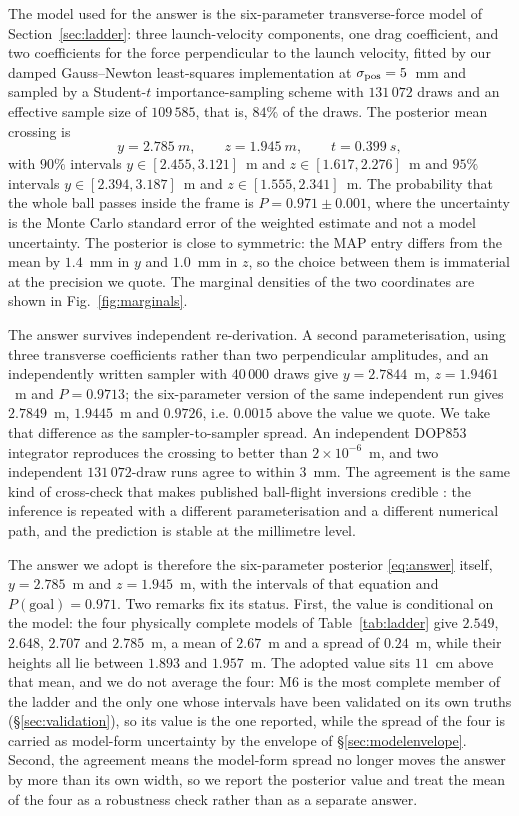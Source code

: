 The model used for the answer is the six-parameter transverse-force model of
Section~\ref{sec:ladder}: three launch-velocity components, one drag coefficient,
and two coefficients for the force perpendicular to the launch velocity, fitted by
our damped Gauss--Newton least-squares implementation at
$\sigma_{\rm pos}=5$~mm and sampled by a Student-$t$ importance-sampling scheme
with $131\,072$ draws and an effective sample size of $109\,585$, that is, $84\%$
of the draws. The posterior mean crossing is
\begin{equation}
  y = 2.785~\si{m}, \qquad z = 1.945~\si{m}, \qquad t = 0.399~\si{s},
  \label{eq:answer}
\end{equation}
with $90\%$ intervals $y\in[2.455,3.121]$~m and $z\in[1.617,2.276]$~m and
$95\%$ intervals $y\in[2.394,3.187]$~m and $z\in[1.555,2.341]$~m. The
probability that the whole ball passes inside the frame is $P=0.971\pm0.001$,
where the uncertainty is the Monte Carlo standard error of the weighted estimate
and not a model uncertainty. The posterior is
close to symmetric: the MAP entry differs from the mean by $1.4$~mm in $y$ and
$1.0$~mm in $z$, so the choice between them is immaterial at the precision we
quote. The marginal densities of the two coordinates are shown in
Fig.~\ref{fig:marginals}.

The answer survives independent re-derivation. A second parameterisation, using
three transverse coefficients rather than two perpendicular amplitudes, and an
independently written sampler with $40\,000$ draws give $y=2.7844$~m,
$z=1.9461$~m and $P=0.9713$; the six-parameter version of the same independent
run gives $2.7849$~m, $1.9445$~m and $0.9726$, i.e. $0.0015$ above the value we
quote. We take that difference as the sampler-to-sampler spread. An independent DOP853 integrator
reproduces the crossing to better than $2\times10^{-6}$~m, and two independent
$131\,072$-draw runs agree to within $3$~mm. The agreement is the same kind of
cross-check that makes published ball-flight inversions credible
\citep{nathan2008pitchfx,florio2019}: the inference is repeated with a different
parameterisation and a different numerical path, and the prediction is stable at
the millimetre level.

The answer we adopt is therefore the six-parameter posterior
\eqref{eq:answer} itself, $y=2.785$~m and $z=1.945$~m, with the intervals of
that equation and $P(\text{goal})=0.971$. Two remarks fix its status. First,
the value is conditional on the model: the four physically complete models of
Table~\ref{tab:ladder} give $2.549$, $2.648$, $2.707$ and $2.785$~m, a mean of
$2.67$~m and a spread of $0.24$~m, while their heights all lie between $1.893$
and $1.957$~m. The adopted value sits $11$~cm above that mean, and we do not
average the four: M6 is the most complete member of the ladder and the only one
whose intervals have been validated on its own truths (\S\ref{sec:validation}),
so its value is the one reported, while the spread of the four is carried as
model-form uncertainty by the envelope of \S\ref{sec:modelenvelope}. Second,
the agreement means the model-form spread no longer moves the answer by more
than its own width, so we report the posterior value and treat the mean of the
four as a robustness check rather than as a separate answer.

